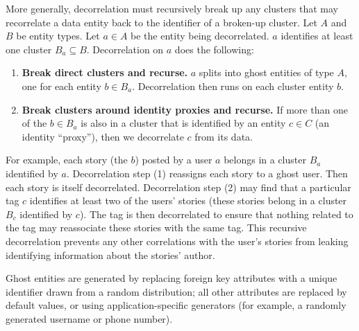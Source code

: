 More generally, decorrelation must recursively break up any clusters that may recorrelate a data
entity back to the identifier of a broken-up cluster. Let $A$ and $B$ be entity types. Let $a \in A$
be the entity being decorrelated. $a$ identifies at least one cluster $B_a \subseteq B$.
Decorrelation on $a$ does the following: 
\begin{enumerate} 
    
    \item \textbf{Break direct clusters and
            recurse.} $a$ splits into ghost entities of type $A$, one for each entity $b\in B_a$.
            Decorrelation then runs on each cluster entity $b$.

    \item \textbf{Break clusters around identity proxies and recurse.} If more than one of the
        $b \in B_a$ is also in a cluster that is identified by an entity $c \in C$ (an identity
        ``proxy''), then we decorrelate $c$ from its data. 
        
\end{enumerate}
For example, each story (the $b$) posted by a user $a$ belongs in a cluster $B_a$ identified by $a$.
Decorrelation step (1) reassigns each story to a ghost user. Then each story is itself decorrelated.
Decorrelation step (2) may find that a particular tag $c$ identifies at least two of the users'
stories (these stories belong in a cluster $B_c$ identified by $c$). The tag is then decorrelated to
ensure that nothing related to the tag may reassociate these stories with the same tag.  This
recursive decorrelation prevents any other correlations with the user's stories from leaking
identifying information about the stories' author.

Ghost entities are generated by replacing foreign key attributes with a unique identifier drawn
from a random distribution; all other attributes are replaced by default values, or
using application-specific generators (for example, a randomly generated username or phone number).


